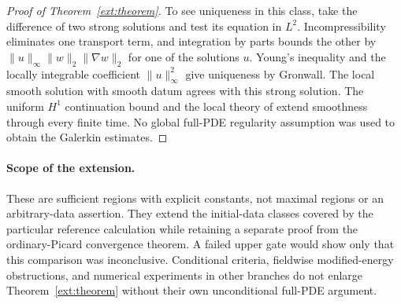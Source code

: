 \begin{proof}[Proof of Theorem~\ref{ext:theorem}]
To see uniqueness in this class, take the difference of two strong
solutions and test its equation in $L^2$. Incompressibility eliminates
one transport term, and integration by parts bounds the other by
$\|u\|_\infty\|w\|_2\|\nabla w\|_2$ for one of the solutions $u$.
Young's inequality and the locally integrable coefficient
$\|u\|_\infty^2$ give uniqueness by Gronwall. The local smooth solution
with smooth datum agrees with this strong solution. The uniform $H^1$
continuation bound and the local theory of \cite[Proposition~2.2]{Tao2009} extend smoothness
through every finite time. No global full-PDE regularity assumption was
used to obtain the Galerkin estimates.
\end{proof}

\paragraph{Scope of the extension.}
These are sufficient regions with explicit constants, not maximal regions
or an arbitrary-data assertion. They extend the initial-data classes covered
by the particular reference calculation while retaining a separate proof
from the ordinary-Picard convergence theorem. A failed upper gate would
show only that this comparison was inconclusive. Conditional criteria,
fieldwise modified-energy obstructions, and numerical experiments in other
branches do not enlarge Theorem~\ref{ext:theorem} without their own
unconditional full-PDE argument.
